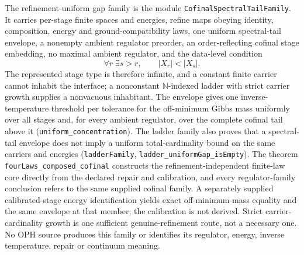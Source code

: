 \documentclass[11pt]{article}
\newcounter{none}
\begin{document}
The refinement-uniform gap family is the module
\texttt{CofinalSpectralTailFamily}. It carries per-stage finite spaces and
energies, refine maps obeying identity, composition, energy and
ground-compatibility laws, one uniform spectral-tail envelope, a nonempty
ambient regulator preorder, an order-reflecting cofinal stage embedding, no
maximal ambient regulator, and the data-level condition
\[
 \forall r\;\exists s>r,
 \qquad |X_r|<|X_s|.
\]
The represented stage type is therefore infinite, and a constant finite
carrier cannot inhabit the interface; a nonconstant \(\mathbb N\)-indexed
ladder with strict carrier growth supplies a nonvacuous inhabitant. The
envelope gives one inverse-temperature threshold per tolerance for the
off-minimum Gibbs mass uniformly over all stages and, for every ambient
regulator, over the complete cofinal tail above it
(\texttt{uniform\_concentration}). The ladder family also proves that a
spectral-tail envelope does not imply a uniform total-cardinality bound on the
same carriers and energies (\texttt{ladderFamily},
\texttt{ladder\_uniformGap\_isEmpty}). The theorem
\texttt{fourLaws\_composed\_cofinal} constructs the refinement-independent
finite-law core directly from the declared repair and calibration, and every
regulator-family conclusion refers to the same supplied cofinal family. A
separately supplied calibrated-stage energy identification yields exact
off-minimum-mass equality and the same envelope at that member; the
calibration is not derived. Strict carrier-cardinality growth is one
sufficient genuine-refinement route, not a necessary one. No OPH source
produces this family or identifies its regulator, energy, inverse
temperature, repair or continuum meaning.
\end{document}

